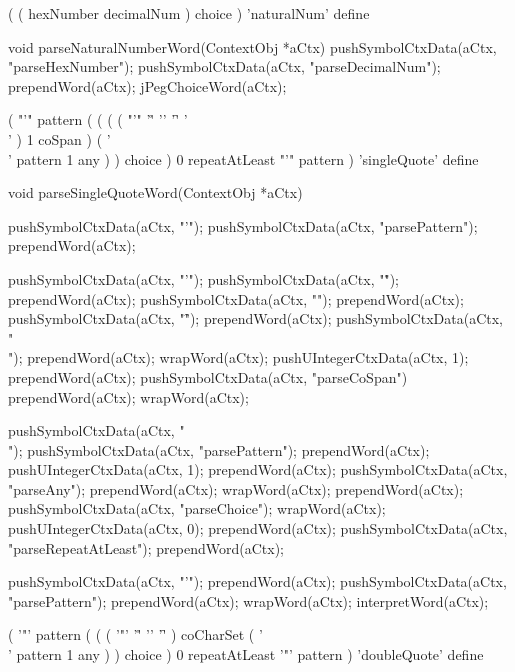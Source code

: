 \starttyping
(
  ( hexNumber decimalNum ) choice
) 'naturalNum' define
\stoptyping

\startCCode
void parseNaturalNumberWord(ContextObj *aCtx) {
  pushSymbolCtxData(aCtx, "parseHexNumber");
  pushSymbolCtxData(aCtx, "parseDecimalNum");
  prependWord(aCtx);
  jPegChoiceWord(aCtx);
}
\stopCCode

\starttyping
(
  "'" pattern
  ( 
    (
      ( ( "'" '\r' '\n' '\f' '\\' ) 1 coSpan )
      ( '\\' pattern 1 any )
    ) choice
  ) 0 repeatAtLeast
  "'" pattern
) 'singleQuote' define
\stoptyping

\startCCode
void parseSingleQuoteWord(ContextObj *aCtx) {
  pushSymbolCtxData(aCtx, "'");
  pushSymbolCtxData(aCtx, "parsePattern");
  prependWord(aCtx);
  
  pushSymbolCtxData(aCtx, "'");
  pushSymbolCtxData(aCtx, "\r");
  prependWord(aCtx);
  pushSymbolCtxData(aCtx, "\n");
  prependWord(aCtx);
  pushSymbolCtxData(aCtx, "\f");
  prependWord(aCtx);
  pushSymbolCtxData(aCtx, "\\");
  prependWord(aCtx);
  wrapWord(aCtx);
  pushUIntegerCtxData(aCtx, 1);
  prependWord(aCtx);
  pushSymbolCtxData(aCtx, "parseCoSpan")
  prependWord(aCtx);
  wrapWord(aCtx);
  
  pushSymbolCtxData(aCtx, "\\");
  pushSymbolCtxData(aCtx, "parsePattern");
  prependWord(aCtx);
  pushUIntegerCtxData(aCtx, 1);
  prependWord(aCtx);
  pushSymbolCtxData(aCtx, "parseAny");
  prependWord(aCtx);
  wrapWord(aCtx);
  prependWord(aCtx);
  pushSymbolCtxData(aCtx, "parseChoice");
  wrapWord(aCtx);
  pushUIntegerCtxData(aCtx, 0);
  prependWord(aCtx);
  pushSymbolCtxData(aCtx, "parseRepeatAtLeast");
  prependWord(aCtx);
  
  pushSymbolCtxData(aCtx, "'");
  prependWord(aCtx);
  pushSymbolCtxData(aCtx, "parsePattern");
  prependWord(aCtx);
  wrapWord(aCtx);
  interpretWord(aCtx);
}
\stopCCode

\starttyping
(
  '"' pattern
  ( 
    (
      ( '"' '\r' '\n' '\f' ) coCharSet
      ( '\\' pattern 1 any )
    ) choice
  ) 0 repeatAtLeast
  '"' pattern
) 'doubleQuote' define
\stoptyping

